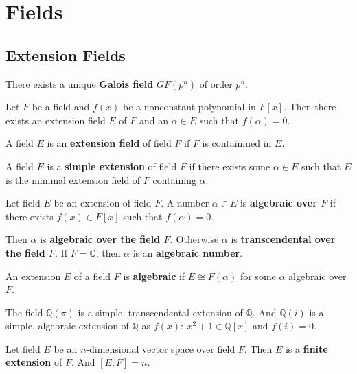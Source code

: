 \section{Fields}

\subsection{Extension Fields}
\begin{definition}
	There exists a unique \textbf{Galois field} $GF(p^n)$ of order $p^n$.
\end{definition}

\begin{theorem}[Kronecker]
	Let $F$ be a field and $f(x)$ be a nonconstant polynomial in $F[x]$.
	Then there exists an extension field $E$ of $F$ and an $\alpha \in E$ such that $f(\alpha) = 0$.
\end{theorem}

\begin{definition}
	A field $E$ is an \textbf{extension field} of field $F$ if $F$ is containined in $E$.
\end{definition}

\begin{definition}
	A field $E$ is a \textbf{simple extension} of field $F$ if there exists some $\alpha \in E$ such that $E$ is the minimal extension field of $F$ containing $\alpha$.
\end{definition}

\begin{definition}
	Let field $E$ be an extension of field $F$.
	A number $\alpha \in E$ is \textbf{algebraic over $F$} if there exists $f(x) \in F[x]$ such that $f(\alpha) = 0$.
\end{definition}

	Then $\alpha$ is \textbf{algebraic over the field $F$.}
	Otherwise $\alpha$ is \textbf{transcendental over the field $F$}.
	If $F = \mathbb{Q}$, then $\alpha$ is an \textbf{algebraic number}.

\begin{definition}
	An extension $E$ of a field $F$ is \textbf{algebraic} if $E \cong F(\alpha)$ for some $\alpha$ algebraic over $F$.
\end{definition}
	The field $\mathbb{Q}(\pi)$ is a simple, transcendental extension of $\mathbb{Q}$.
	And $\mathbb{Q}(i)$ is a simple, algebraic extension of $\mathbb{Q}$ as $f(x):\ x^2+1 \in \mathbb{Q}[x]$ and $f(i) = 0$.

\begin{definition}
	Let field $E$ be an $n$-dimensional vector space over field $F$.
	Then $E$ is a \textbf{finite extension} of $F$.
	And $[E:F] = n$.
\end{definition}

